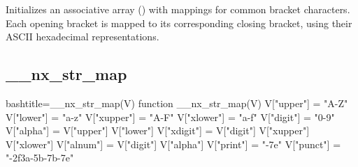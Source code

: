 \begin{NexMainBox}
	\begin{NexMainBox}
		Initializes an associative array () with mappings for common bracket characters. Each opening bracket is mapped to its corresponding closing bracket, using their ASCII hexadecimal representations.
	\end{NexMainBox}
	\begin{NexMainBox}
		\begin{NexListDark}
		\end{NexListDark}
	\end{NexMainBox}
\end{NexMainBox}

\subsection{__nx_str_map}
\label{__nx_str_map}
\begin{NexCodeBox}{bash}{title={__nx_str_map(V)}}
function __nx_str_map(V) {
	V["upper"] = "A-Z"
	V["lower"] = "a-z"
	V["xupper"] = "A-F"
	V["xlower"] = "a-f"
	V["digit"] = "0-9"
	V["alpha"] = V["upper"] V["lower"]
	V["xdigit"] = V["digit"] V["xupper"] V["xlower"]
	V["alnum"] = V["digit"] V["alpha"]
	V["print"] = "-\x7e"
	V["punct"] = "-\x2f\x3a-\x5b-\x7b-\x7e"
}
\end{NexCodeBox}

